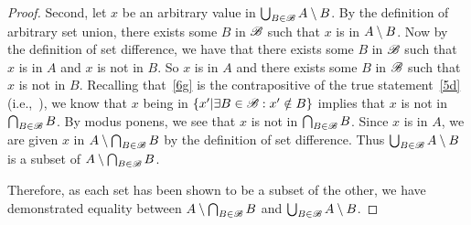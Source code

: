 \documentclass[main.tex]{subfiles}
\begin{document}
\begin{proof}
	\medskip{}
	Second, let \(x\) be an arbitrary value in
	\(\bigcup_{B \in \mathscr{B}} {A \setminus B}\). By the definition
	of arbitrary set union, there exists some \(B\) in \(\mathscr{B}\) such
	that \(x\) is in \(A \setminus B\). Now by the definition of set
	difference, we have that there exists some \(B\) in \(\mathscr{B}\) such
	that \(x\) is in \(A\) and \(x\) is not in \(B\). So \(x\) is in \(A\)
	and there exists some \(B\) in \(\mathscr{B}\) such that \(x\) is not in
	\(B\). Recalling that~\ref{6g} is the contrapositive of the true
	statement~\ref{5d} (i.e.,~), we know that \(x\) being in
	\(\{x'|\exists B \in \mathscr{B} : x' \notin B\}\)
	implies that \(x\) is not in
	\(\bigcap_{B \in \mathscr{B}} {B}\). By modus ponens, we
	see that \(x\) is not in
	\(\bigcap_{B \in \mathscr{B}} {B}\). Since \(x\) is in
	\(A\), we are given \(x\) in
	\(A \setminus \bigcap_{B \in \mathscr{B}} {B}\) by the
	definition of set difference. Thus
	\(\bigcup_{B \in \mathscr{B}} {A \setminus B}\) is a subset of
	\(A \setminus \bigcap_{B \in \mathscr{B}} {B}\).

	\medskip{}
	Therefore, as each set has been shown to be a subset of the other, we
	have demonstrated equality between
	\(A \setminus \bigcap_{B \in \mathscr{B}} {B}\) and
	\(\bigcup_{B \in \mathscr{B}} {A \setminus B}\).
\end{proof}
\end{document}
